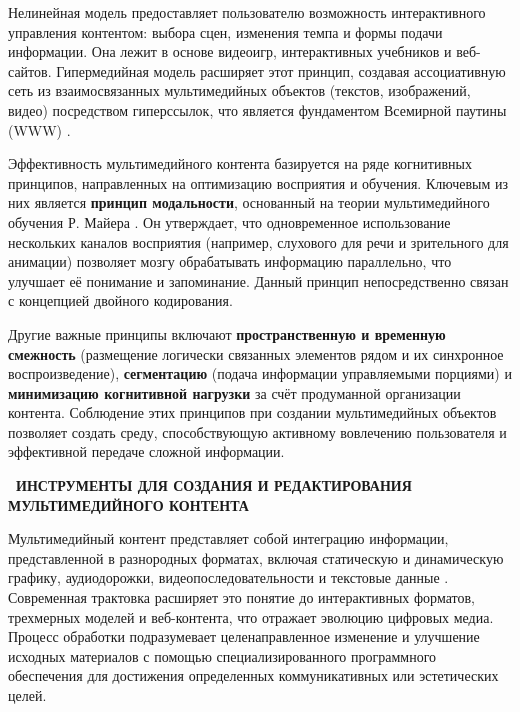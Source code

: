 \documentclass{SibFU-docs}
\begin{document}

Нелинейная модель предоставляет пользователю возможность интерактивного управления контентом: выбора сцен, изменения темпа и формы подачи информации. Она лежит в основе видеоигр, интерактивных учебников и веб-сайтов. Гипермедийная модель расширяет этот принцип, создавая ассоциативную сеть из взаимосвязанных мультимедийных объектов (текстов, изображений, видео) посредством гиперссылок, что является фундаментом Всемирной паутины (WWW) \cite{web91}.


Эффективность мультимедийного контента базируется на ряде когнитивных принципов, направленных на оптимизацию восприятия и обучения. Ключевым из них является \textbf{принцип модальности}, основанный на теории мультимедийного обучения Р. Майера \cite{web117}. Он утверждает, что одновременное использование нескольких каналов восприятия (например, слухового для речи и зрительного для анимации) позволяет мозгу обрабатывать информацию параллельно, что улучшает её понимание и запоминание. Данный принцип непосредственно связан с концепцией двойного кодирования.

Другие важные принципы включают \textbf{пространственную и временную смежность} (размещение логически связанных элементов рядом и их синхронное воспроизведение), \textbf{сегментацию} (подача информации управляемыми порциями) и \textbf{минимизацию когнитивной нагрузки} за счёт продуманной организации контента. Соблюдение этих принципов при создании мультимедийных объектов позволяет создать среду, способствующую активному вовлечению пользователя и эффективной передаче сложной информации.

\newpage
{}
\begin{center}\textbf{\thesection\ ИНСТРУМЕНТЫ ДЛЯ СОЗДАНИЯ И РЕДАКТИРОВАНИЯ МУЛЬТИМЕДИЙНОГО КОНТЕНТА}\end{center}
\vspace*{-1.5em}


Мультимедийный контент представляет собой интеграцию информации, представленной в разнородных форматах, включая статическую и динамическую графику, аудиодорожки, видеопоследовательности и текстовые данные \cite{skypro}. Современная трактовка расширяет это понятие до интерактивных форматов, трехмерных моделей и веб-контента, что отражает эволюцию цифровых медиа. Процесс обработки подразумевает целенаправленное изменение и улучшение исходных материалов с помощью специализированного программного обеспечения для достижения определенных коммуникативных или эстетических целей.
\end{document}
